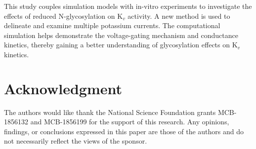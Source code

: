 \documentclass[journal]{IEEEtran}
\begin{document}
This study couples simulation models with in-vitro experiments to investigate the effects of reduced N-glycosylation on $\text{K}_{v}$ activity. A new method is used to delineate and examine multiple potassium currents. The computational simulation helps demonstrate the voltage-gating mechanism and conductance kinetics, thereby gaining a better understanding of glycosylation effects on $\text{K}_{v}$ kinetics. 

\section*{Acknowledgment}
The authors would like thank the National Science Foundation grants MCB-1856132 and MCB-1856199 for the support of this research. Any opinions, findings, or conclusions expressed in this paper are those of the authors and do not necessarily reflect the views of the sponsor.



%

\end{document}
